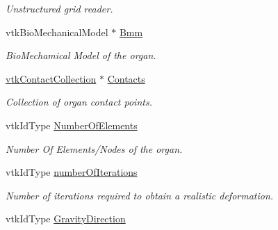 \begin{DoxyCompactItemize}
\begin{DoxyCompactList}\small\item\em Unstructured grid reader. \item\end{DoxyCompactList}\item 
\hypertarget{classvtkOrgan_addaff1a7cdd0ab90c4a5de3ae53def26}{
vtkBioMechanicalModel $\ast$ \hyperlink{classvtkOrgan_addaff1a7cdd0ab90c4a5de3ae53def26}{Bmm}}
\label{classvtkOrgan_addaff1a7cdd0ab90c4a5de3ae53def26}

\begin{DoxyCompactList}\small\item\em BioMechamical Model of the organ. \item\end{DoxyCompactList}\item 
\hypertarget{classvtkOrgan_a58b0a4343cff0509ac618c4544cfdb46}{
\hyperlink{classvtkContactCollection}{vtkContactCollection} $\ast$ \hyperlink{classvtkOrgan_a58b0a4343cff0509ac618c4544cfdb46}{Contacts}}
\label{classvtkOrgan_a58b0a4343cff0509ac618c4544cfdb46}

\begin{DoxyCompactList}\small\item\em Collection of organ contact points. \item\end{DoxyCompactList}\item 
\hypertarget{classvtkOrgan_af3c6805f5d942e3010031562ad68bb45}{
vtkIdType \hyperlink{classvtkOrgan_af3c6805f5d942e3010031562ad68bb45}{NumberOfElements}}
\label{classvtkOrgan_af3c6805f5d942e3010031562ad68bb45}

\begin{DoxyCompactList}\small\item\em Number Of Elements/Nodes of the organ. \item\end{DoxyCompactList}\item 
\hypertarget{classvtkOrgan_a9cf2eec29b5d474eacdd9f699bcebe94}{
vtkIdType \hyperlink{classvtkOrgan_a9cf2eec29b5d474eacdd9f699bcebe94}{numberOfIterations}}
\label{classvtkOrgan_a9cf2eec29b5d474eacdd9f699bcebe94}

\begin{DoxyCompactList}\small\item\em Number of iterations required to obtain a realistic deformation. \item\end{DoxyCompactList}\item 
\hypertarget{classvtkOrgan_a5dd255d4994f9557c1badd809d01afec}{
vtkIdType \hyperlink{classvtkOrgan_a5dd255d4994f9557c1badd809d01afec}{GravityDirection}}
\label{classvtkOrgan_a5dd255d4994f9557c1badd809d01afec}


\end{DoxyCompactItemize}
